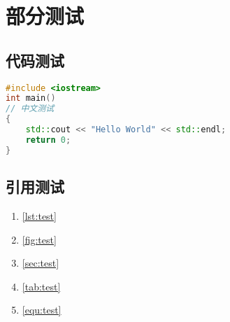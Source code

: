 
\intoappendix

\section{部分测试}
\subsection{代码测试}
\begin{lstlisting}[language=c++, caption=测试代码, label=lst:test]
#include <iostream>
int main()
// 中文测试
{
    std::cout << "Hello World" << std::endl;
    return 0;
}
\end{lstlisting}

\subsection{引用测试}
\begin{enumerate}
    \item \autoref{lst:test}
    \item \autoref{fig:test}
    \item \autoref{sec:test}
    \item \autoref{tab:test}
    \item \autoref{equ:test}
\end{enumerate}